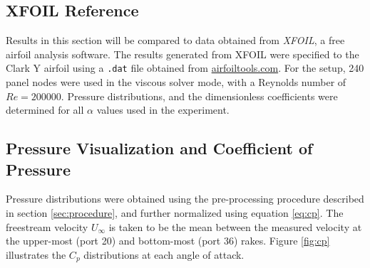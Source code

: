 \documentclass[runningheads]{llncs}
\begin{document}
\subsection{XFOIL Reference}

\noindent
Results in this section will be compared to data obtained from \textit{XFOIL}, a free airfoil analysis software. The results generated from XFOIL were specified to the Clark Y airfoil using a \verb|.dat| file obtained from \href{http://airfoiltools.com/airfoil/details?airfoil=clarky-il}{airfoiltools.com}. For the setup, 240 panel nodes were used in the viscous solver mode, with a Reynolds number of $Re = 200000$. Pressure distributions, and the dimensionless coefficients were determined for all $\alpha$ values used in the experiment.\newline

\subsection{Pressure Visualization and Coefficient of Pressure}

\noindent
Pressure distributions were obtained using the pre-processing procedure described in section \ref{sec:procedure}, and further normalized using equation \ref{eq:cp}. The freestream velocity $U_\infty$ is taken to be the mean between the measured velocity at the upper-most (port 20) and bottom-most (port 36) rakes. Figure \ref{fig:cp} illustrates the $C_p$ distributions at each angle of attack. \newline
\end{document}
